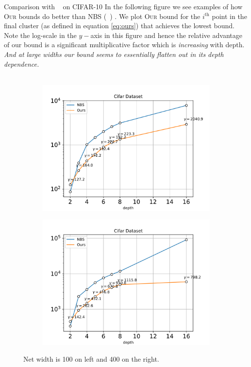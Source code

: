 \documentclass[final,t]{beamer}
\begin{document}
\begin{frame}[containsverbatim]
\begin{columns}[t]
\begin{column}{.32\linewidth}
\begin{exampleblock}{Comparison with ~\cite{neyshabur2017pac} on CIFAR-10}
In the following figure we see examples of how \textsc{Our} bounds do better than \textsc{NBS} (~\cite{neyshabur2017pac}) . We plot \textsc{Our} bound for the $i^{\text{th}}$ point in the final cluster (as defined in equation \ref{eq:ours}) that achieves the lowest bound. Note the log-scale in the $y-$axis in this figure and hence the relative advantage of our bound is a significant multiplicative factor which is {\it increasing} with depth. {\it And at large widths our bound seems to essentially flatten out in its depth dependence.}
~\\~\\ 
\begin{figure}
\begin{subfigure}[b]{.45\columnwidth}
    \includegraphics[trim=0 15 0 35,clip,width=\linewidth]{dcifar.pdf}
\end{subfigure}
\hfill 
\begin{subfigure}[b]{.45\columnwidth}
   \includegraphics[trim=0 80 0 170,clip,width=\linewidth]{CIFAR_Width_400.png}
\end{subfigure}
\caption{Net width is 100 on left and 400 on the right.}
\label{fig:dcif}
\end{figure}
\end{exampleblock}



\end{column}
\end{columns}
\end{frame}
\end{document}
